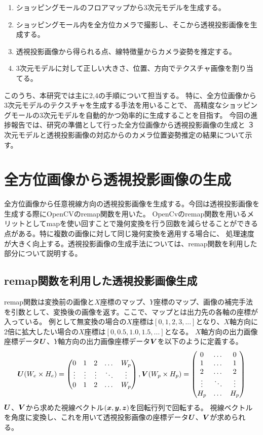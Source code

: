 \documentclass[]{jarticle}          %
\begin{document}
\begin{enumerate}
  \item ショッピングモールのフロアマップから3次元モデルを生成する。
  \item ショッピングモール内を全方位カメラで撮影し、そこから透視投影画像を生成する。
  \item 透視投影画像から得られる点、線特徴量からカメラ姿勢を推定する。
  \item 3次元モデルに対して正しい大きさ、位置、方向でテクスチャ画像を割り当てる。
\end{enumerate}
このうち、本研究では主に2,4の手順について担当する。
特に、全方位画像から3次元モデルのテクスチャを生成する手法を用いることで、
高精度なショッピングモールの3次元モデルを自動的かつ効率的に生成することを目指す。
今回の進捗報告では、研究の準備として行った全方位画像から透視投影画像の生成と
３次元モデルと透視投影画像の対応からのカメラ位置姿勢推定の結果について示す。

\section{全方位画像から透視投影画像の生成}
全方位画像から任意視線方向の透視投影画像を生成する。今回は透視投影画像を生成する際にOpenCVのremap関数を用いた。
OpenCvのremap関数を用いるメリットとしてmapを使い回すことで幾何変換を行う回数を減らせることができる点がある。特に複数の画像に対して同じ幾何変換を適用する場合に、
処理速度が大きく向上する。透視投影画像の生成手法については、remap関数を利用した部分について説明する。
\subsection{remap関数を利用した透視投影画像生成}
remap関数は変換前の画像と$X$座標のマップ、$Y$座標のマップ、画像の補完手法を引数として、変換後の画像を返す。ここで、マップとは出力先の各軸の座標が入っている。
例として無変換の場合の$X$座標は$[0,1,2,3,...]$となり、$X$軸方向に2倍に拡大したい場合の$X$座標は$[0,0.5,1.0,1.5,...]$となる。
$X$軸方向の出力画像座標データ$\mbox{\boldmath $U$}$、$Y$軸方向の出力画像座標データ$\mbox{\boldmath $V$}$を以下のように定義する。
\begin{equation}
  \mbox{\boldmath $U$}(W_e \times H_e) = 
  \begin{pmatrix}
    0 & 1 & 2 & \dots & W_p \\
    \vdots & \vdots  & \vdots & \ddots & \vdots \\
    0 & 1 & 2 & \dots & W_p \\
  \end{pmatrix}
  ,
  \mbox{\boldmath $V$}(W_p \times H_p) = 
  \begin{pmatrix}
    0 & \dots & 0 \\
    1 & \dots & 1 \\
    2 & \dots & 2 \\
    \vdots & \ddots & \vdots \\
    H_p & \dots & H_p \\
  \end{pmatrix}
\end{equation}
$\mbox{\boldmath $U$}$、$\mbox{\boldmath $V$}$から求めた視線ベクトル$(\mbox{\boldmath $x$},\mbox{\boldmath $y$},\mbox{\boldmath $z$})$を回転行列で回転する。
視線ベクトルを角度に変換し、これを用いて透視投影画像の座標データ$\mbox{\boldmath $U$}$、$\mbox{\boldmath $V$}$が求められる。
\end{document}
